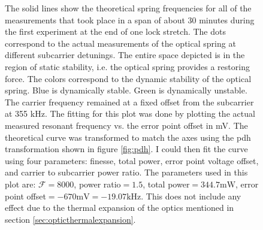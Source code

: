 \begin{figure}
    \caption[Parameters from 1st Experiment]{
      The solid lines show the theoretical
      spring frequencies for all of the measurements that took place in a span
      of about 30 minutes during the first experiment at the end of one lock
      stretch.
      The dots correspond to the actual measurements of the optical spring at
      different subcarrier detunings. The entire space depicted is in the region
      of static stability, i.e. the optical spring provides a restoring force.
      The colors correspond to the dynamic stability of the optical spring.
      Blue is dynamically stable.
      Green is dynamically unstable.
      The carrier frequency remained at a fixed offset from the subcarrier at
      355 kHz.
      The fitting for this plot was done by plotting the actual measured
      resonant frequency vs. the error point offset in mV.
      The theoretical curve was transformed to match the axes using the
      \ac{pdh} transformation shown in figure \ref{fig:pdh}.
      I could then fit the curve using four parameters:
      finesse, total power, error point voltage offset,
      and carrier to subcarrier power ratio.
      The parameters used in this plot are:
      $\mathcal{F}=8000$, power ratio$=1.5$, total power$=344.7\mathrm{mW}$,
      error point offset$=-670\mathrm{mV}=-19.07\mathrm{kHz}$.
      This does not include any effect due to the thermal expansion of the
      optics mentioned in section \ref{sec:opticthermalexpansion}.
      }
  \label{fig:april_space1}
\end{figure}


